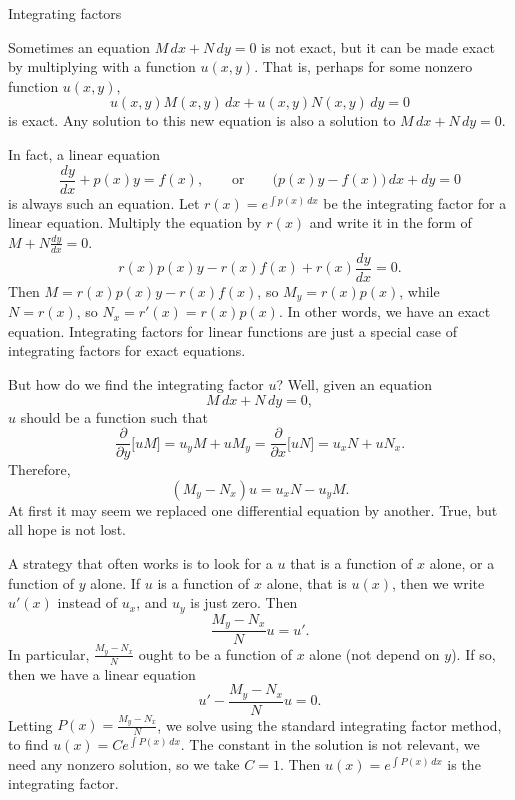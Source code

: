 \documentclass[10pt,aspectratio=169]{beamer}
\begin{document}
\begin{frame}

{Integrating factors}

Sometimes an equation $M\, dx + N \, dy = 0$ is not exact, but it can be
made exact by multiplying with a function $u(x,y)$.  That is, perhaps
for some nonzero function $u(x,y)$,
\begin{equation*}
u(x,y) M(x,y) \, dx + u(x,y) N(x,y) \, dy = 0
\end{equation*}
is exact.  Any solution to this new equation is also a solution to
$M\, dx + N \, dy = 0$.

In fact, a linear equation
\begin{equation*}
\frac{dy}{dx} + p(x) y = f(x), \qquad
\text{or} \qquad
\bigl( p(x) y - f(x) \bigr)\, dx +  dy  = 0
\end{equation*}
is always such an equation.  Let $r(x) = e^{\int p(x)\,dx}$ be the
integrating factor for a linear equation.  Multiply the equation by $r(x)$
and write it in the form of $M + N \frac{dy}{dx} = 0$.
\begin{equation*}
r(x) p(x) y - r(x) f(x) + r(x) \frac{dy}{dx} = 0 .
\end{equation*}
Then $M = r(x) p(x) y - r(x) f(x)$, so
$M_y = r(x) p(x)$, while $N = r(x)$, so
$N_x = r'(x) = r(x) p(x)$.  In other words, we have an exact equation.
Integrating
factors for linear functions are just a special case of integrating
factors for exact equations.

But how do we find the integrating factor $u$?  Well, given an equation
\begin{equation*}
M \, dx + N \, dy = 0 ,
\end{equation*}
$u$ should be a
function such that
\begin{equation*}
\frac{\partial}{\partial y} \bigl[ u M \bigr] = 
u_y M + u M_y = 
\frac{\partial}{\partial x} \bigl[ u N \bigr] = 
u_x N + u N_x .
\end{equation*}
Therefore,
\begin{equation*}
(M_y-N_x)u = u_x N - u_y M .
\end{equation*}
At first it may seem we replaced one differential equation by another.
True, but all hope is not lost.

A strategy that often works is to look for a $u$ that is a function
of $x$ alone, or a function of $y$ alone.  If $u$ is a function of $x$
alone,
that is $u(x)$, then we write $u'(x)$ instead of $u_x$, and $u_y$ is just
zero.
Then
\begin{equation*}
\frac{M_y-N_x}{N}u = u' .
\end{equation*}
In particular, $\frac{M_y-N_x}{N}$ ought to be a function of $x$ alone (not
depend on $y$).  If so, then we have a linear equation
\begin{equation*}
u' - \frac{M_y-N_x}{N} u = 0 .
\end{equation*}
Letting $P(x) = \frac{M_y-N_x}{N}$,
we solve using the standard integrating factor method,
to find $u(x) = C e^{\int P(x) \, dx}$.  The constant in the
solution is not relevant, we need any nonzero solution,
so we take $C=1$.
Then $u(x) = e^{\int P(x) \, dx}$ is the integrating factor.


\end{frame}
\end{document}
